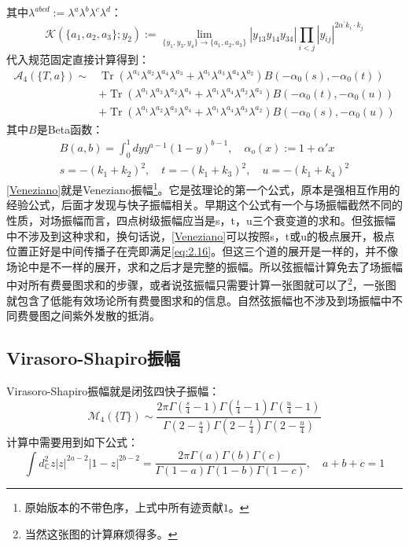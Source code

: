 其中$\lambda^{abcd}:=\lambda^a\lambda^b\lambda^c\lambda^d$：
\begin{equation}
	\mathcal{K}(\{a_1,a_2,a_3\};y_2):=\lim_{\{y_1,y_3,y_4\}\to\{a_1,a_2,a_3\}}|y_{13}y_{14}y_{34}|\prod_{i<j}|y_{ij}|^{2\alpha^{\prime}k_i\cdot k_j}
\end{equation}
代入规范固定直接计算得到：
\begin{equation}
	\label{Veneziano}
\begin{aligned}
		\mathcal{A}_4(\{T,a\}) \sim&
	\operatorname{Tr}\left(\lambda^{a_1}\lambda^{a_2}\lambda^{a_4}\lambda^{a_3}+\lambda^{a_1}\lambda^{a_3}\lambda^{a_4}\lambda^{a_2}\right)B(-\alpha_0(s),-\alpha_0(t))\\
	&+\operatorname{Tr}\left(\lambda^{a_1}\lambda^{a_3}\lambda^{a_2}\lambda^{a_4}+\lambda^{a_1}\lambda^{a_4}\lambda^{a_2}\lambda^{a_3}\right)B(-\alpha_0(t),-\alpha_0(u))\\
	&+\operatorname{Tr}\left(\lambda^{a_1}\lambda^{a_2}\lambda^{a_3}\lambda^{a_4}+\lambda^{a_1}\lambda^{a_4}\lambda^{a_3}\lambda^{a_2}\right)B(-\alpha_0(s),-\alpha_0(u))
\end{aligned}
\end{equation}
其中$B$是Beta函数：
\begin{equation}
\begin{gathered}
		B(a,b)=\int_0^1dyy^{a-1}(1-y)^{b-1},\quad \alpha_o(x):= 1+\alpha' x\\
	s=-(k_1+k_2)^2,\quad t=-(k_1+k_3)^2,\quad u=-(k_1+k_4)^2
\end{gathered}
\end{equation}
\ref{Veneziano}就是Veneziano振幅\footnote{原始版本的不带色序，上式中所有迹贡献$1$。}。它是弦理论的第一个公式，原本是强相互作用的经验公式，后面才发现与快子振幅相关\cite{limiao}。早期这个公式有一个与场振幅截然不同的性质，对场振幅而言，四点树级振幅应当是s，t，u三个衰变道的求和。但弦振幅中不涉及到这种求和，换句话说，\ref{Veneziano}可以按照s，t或u的极点展开，极点位置正好是中间传播子在壳即满足\ref{eq:2.16}。但这三个道的展开是一样的，并不像场论中是不一样的展开，求和之后才是完整的振幅。所以弦振幅计算免去了场振幅中对所有费曼图求和的步骤，或者说弦振幅只需要计算一张图就可以了\footnote{当然这张图的计算麻烦得多。}，一张图就包含了低能有效场论所有费曼图求和的信息。自然弦振幅也不涉及到场振幅中不同费曼图之间紫外发散的抵消。
\subsection{Virasoro-Shapiro振幅}
Virasoro-Shapiro振幅就是闭弦四快子振幅：
\begin{equation}
	\mathcal{M}_4(\{T\}) \sim \frac{2\pi\Gamma(\frac{s}{4}-1)\Gamma(\frac{t}{4}-1)\Gamma(\frac{u}{4}-1)}{\Gamma(2-\frac{s}{4})\Gamma(2-\frac{t}{4})\Gamma(2-\frac{u}{4})}
\end{equation}
计算中需要用到如下公式：
\begin{equation}
	\int d^2_\mathbb{C}z|z|^{2a-2}|1-z|^{2b-2}=\frac{2\pi\Gamma(a)\Gamma(b)\Gamma(c)}{\Gamma(1-a)\Gamma(1-b)\Gamma(1-c)},\quad a+b+c=1
\end{equation}

